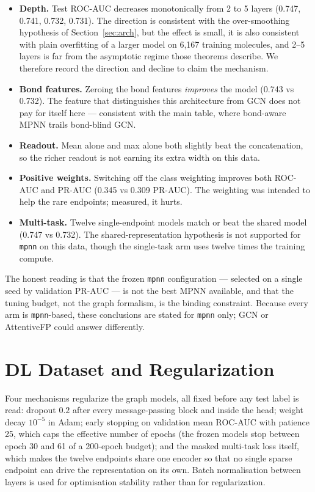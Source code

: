 \documentclass[conference]{IEEEtran}
\newcommand{\code}[1]{\texttt{\small #1}}
\begin{document}
\begin{itemize}
\item \textbf{Depth.} Test ROC-AUC decreases monotonically from 2 to 5 layers
(0.747, 0.741, 0.732, 0.731). The direction is consistent with the over-smoothing hypothesis of
Section~\ref{sec:arch}, but the effect is small, it is also consistent with plain overfitting of
a larger model on 6{,}167 training molecules, and 2--5 layers is far from the asymptotic regime
those theorems describe. We therefore record the direction and decline to claim the mechanism.
\item \textbf{Bond features.} Zeroing the bond features \emph{improves} the model
(0.743 vs 0.732). The feature that distinguishes this architecture from GCN does not pay for
itself here --- consistent with the main table, where bond-aware MPNN trails bond-blind GCN.
\item \textbf{Readout.} Mean alone and max alone both slightly beat the concatenation, so the
richer readout is not earning its extra width on this data.
\item \textbf{Positive weights.} Switching off the class weighting improves both ROC-AUC and
PR-AUC (0.345 vs 0.309 PR-AUC). The weighting was intended to help the rare endpoints; measured,
it hurts.
\item \textbf{Multi-task.} Twelve single-endpoint models match or beat the shared model
(0.747 vs 0.732). The shared-representation hypothesis is not supported for \code{mpnn} on this
data, though the single-task arm uses twelve times the training compute.
\end{itemize}

The honest reading is that the frozen \code{mpnn} configuration --- selected on a single seed by
validation PR-AUC --- is not the best MPNN available, and that the tuning budget, not the graph
formalism, is the binding constraint. Because every arm is \code{mpnn}-based, these conclusions
are stated for \code{mpnn} only; GCN or AttentiveFP could answer differently.

\section{DL Dataset and Regularization}
\label{sec:regularization}
Four mechanisms regularize the graph models, all fixed before any test label is read: dropout
$0.2$ after every message-passing block and inside the head; weight decay $10^{-5}$ in Adam;
early stopping on validation mean ROC-AUC with patience 25, which caps the effective number of
epochs (the frozen models stop between epoch 30 and 61 of a 200-epoch budget); and the masked
multi-task loss itself, which makes the twelve endpoints share one encoder so that no single
sparse endpoint can drive the representation on its own. Batch normalisation between layers is
used for optimisation stability rather than for regularization.
\end{document}
